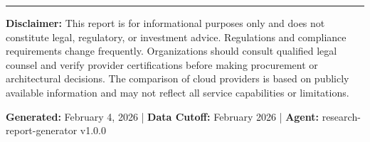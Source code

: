 \documentclass[11pt,a4paper]{article}
\begin{document}
\vfill
\hrule
\vspace{6pt}
{\scriptsize\color{msgray}
\textbf{Disclaimer:} This report is for informational purposes only and does not constitute legal, regulatory, or investment advice. Regulations and compliance requirements change frequently. Organizations should consult qualified legal counsel and verify provider certifications before making procurement or architectural decisions. The comparison of cloud providers is based on publicly available information and may not reflect all service capabilities or limitations.

\vspace{4pt}
\textbf{Generated:} February 4, 2026 | \textbf{Data Cutoff:} February 2026 | \textbf{Agent:} research-report-generator v1.0.0
}
\end{document}
